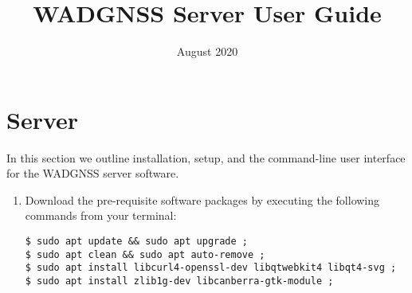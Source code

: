 \documentclass[12pt, letterpaper, twoside]{article}
\begin{document}
\title{WADGNSS Server User Guide}
\date{August 2020}

\begin{titlepage}
	\maketitle
\end{titlepage}

\tableofcontents
\newpage

\section{Server}
In this section we outline installation, setup, and the command-line user interface for the WADGNSS server software. 

\begin{enumerate}
\item Download the pre-requisite software packages by executing the following commands from your terminal:
\begin{verbatim}
$ sudo apt update && sudo apt upgrade ;
$ sudo apt clean && sudo apt auto-remove ;
$ sudo apt install libcurl4-openssl-dev libqtwebkit4 libqt4-svg ;
$ sudo apt install zlib1g-dev libcanberra-gtk-module ;
\end{verbatim}

\end{enumerate}
\end{document}
